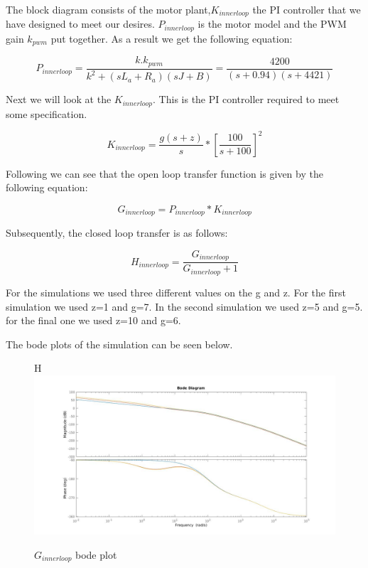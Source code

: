 The block diagram consists of the motor plant,$K_{innerloop}$ the PI controller that we have designed to meet our desires. $P_{innerloop}$ is the motor model and the PWM gain $k_{pwm}$ put together. As a result we get the following equation:

\begin{equation}
P_{innerloop}=\frac{k.k_{pwm}}{k^2+(sL_{a}+R_{a})(sJ+B)}=\frac{4200}{(s+0.94)(s+4421)}
\end{equation}

Next we will look at the $K_{innerloop}$. This is the PI controller required to meet some specification. 

\begin{equation}
K_{innerloop}=\frac{g(s+z)}{s}*[\frac{100}{s+100}]^2
\end{equation} 

Following we can see that the open loop transfer function is given by the following equation:

\begin{equation}
G_{innerloop}=P_{innerloop}*K_{innerloop}
\end{equation}

Subsequently, the closed loop transfer is as follows:

\begin{equation}
H_{innerloop}=\frac{G_{innerloop}}{G_{innerloop}+1}
\end{equation}

For the simulations we used three different values on the g and z. For the first simulation we used z=1 and g=7. In the second simulation we used z=5 and g=5. for the final one we used z=10 and g=6.

The bode plots of the simulation can be seen below.

\begin{figure}{H}
\centering
 	\includegraphics[width=1\textwidth]{figures/Ginnerbode.jpg}
	
	
	\caption{$G_{innerloop}$ bode plot} 
 	\label{fig:ginnerloopbode} 
\end{figure}

